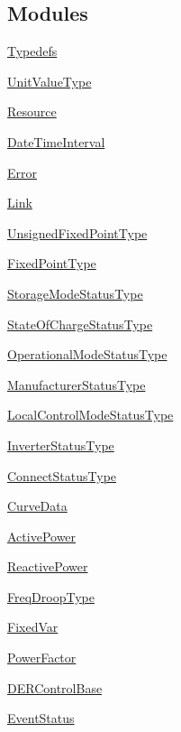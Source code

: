 \subsection*{Modules}
\begin{DoxyCompactItemize}
\item 
\hyperlink{group__se__typedefs}{Typedefs}
\item 
\hyperlink{group__UnitValueType}{Unit\+Value\+Type}
\item 
\hyperlink{group__Resource}{Resource}
\item 
\hyperlink{group__DateTimeInterval}{Date\+Time\+Interval}
\item 
\hyperlink{group__Error}{Error}
\item 
\hyperlink{group__Link}{Link}
\item 
\hyperlink{group__UnsignedFixedPointType}{Unsigned\+Fixed\+Point\+Type}
\item 
\hyperlink{group__FixedPointType}{Fixed\+Point\+Type}
\item 
\hyperlink{group__StorageModeStatusType}{Storage\+Mode\+Status\+Type}
\item 
\hyperlink{group__StateOfChargeStatusType}{State\+Of\+Charge\+Status\+Type}
\item 
\hyperlink{group__OperationalModeStatusType}{Operational\+Mode\+Status\+Type}
\item 
\hyperlink{group__ManufacturerStatusType}{Manufacturer\+Status\+Type}
\item 
\hyperlink{group__LocalControlModeStatusType}{Local\+Control\+Mode\+Status\+Type}
\item 
\hyperlink{group__InverterStatusType}{Inverter\+Status\+Type}
\item 
\hyperlink{group__ConnectStatusType}{Connect\+Status\+Type}
\item 
\hyperlink{group__CurveData}{Curve\+Data}
\item 
\hyperlink{group__ActivePower}{Active\+Power}
\item 
\hyperlink{group__ReactivePower}{Reactive\+Power}
\item 
\hyperlink{group__FreqDroopType}{Freq\+Droop\+Type}
\item 
\hyperlink{group__FixedVar}{Fixed\+Var}
\item 
\hyperlink{group__PowerFactor}{Power\+Factor}
\item 
\hyperlink{group__DERControlBase}{D\+E\+R\+Control\+Base}
\item 
\hyperlink{group__EventStatus}{Event\+Status}
\item 

\end{DoxyCompactItemize}
